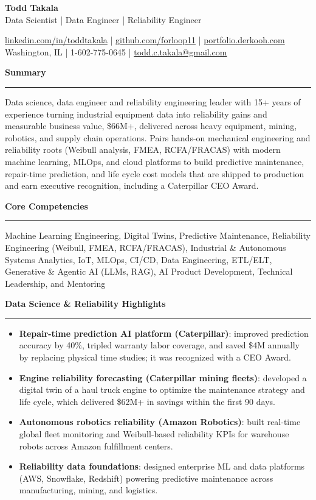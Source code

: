 \documentclass[10pt, letterpaper, sans]{article}
\newcommand{\sectionheader}[1]{%
 \vspace{11pt}%
 \par\noindent\textbf{\Large #1}\par\hrule\vspace{5pt}%
}
\newcommand{\jobtitle}{Data Scientist | Data Engineer | Reliability Engineer}
\begin{document}
\begin{center}
  \textbf{\LARGE Todd Takala} \\
  \vspace{4pt}
  \jobtitle

  \href{https://www.linkedin.com/in/toddtakala}{linkedin.com/in/toddtakala} | \href{https://www.github.com/forloop11}{github.com/forloop11} | \href{https://portfolio.derkooh.com/}{portfolio.derkooh.com} \\
  Washington, IL | 1-602-775-0645 | \href{mailto:todd.c.takala@gmail.com}{todd.c.takala@gmail.com}
\end{center}


\sectionheader{Summary}

Data science, data engineer and reliability engineering leader with 15+ years of experience turning industrial equipment data into reliability gains and measurable business value, \$66M+, delivered across heavy equipment, mining, robotics, and supply chain operations. Pairs hands-on mechanical engineering and reliability roots (Weibull analysis, FMEA, RCFA/FRACAS) with modern machine learning, MLOps, and cloud platforms to build predictive maintenance, repair-time prediction, and life cycle cost models that are shipped to production and earn executive recognition, including a Caterpillar CEO Award.

\sectionheader{Core Competencies}
Machine Learning Engineering, Digital Twins, Predictive Maintenance, Reliability Engineering (Weibull, FMEA, RCFA/FRACAS), Industrial \& Autonomous Systems Analytics, IoT, MLOps, CI/CD, Data Engineering, ETL/ELT, Generative \& Agentic AI (LLMs, RAG), AI Product Development, Technical Leadership, and Mentoring

\sectionheader{Data Science \& Reliability Highlights}
\begin{itemize}
    \item \textbf{Repair-time prediction AI platform (Caterpillar)}: improved prediction accuracy by 40\%, tripled warranty labor coverage, and saved \$4M annually by replacing physical time studies; it was recognized with a CEO Award.
    \item \textbf{Engine reliability forecasting (Caterpillar mining fleets)}: developed a digital twin of a haul truck engine to optimize the maintenance strategy and life cycle, which delivered \$62M+ in savings within the first 90 days.
    \item \textbf{Autonomous robotics reliability (Amazon Robotics)}: built real-time global fleet monitoring and Weibull-based reliability KPIs for warehouse robots across Amazon fulfillment centers.
    \item \textbf{Reliability data foundations}: designed enterprise ML and data platforms (AWS, Snowflake, Redshift) powering predictive maintenance across manufacturing, mining, and logistics.
\end{itemize}
\end{document}

